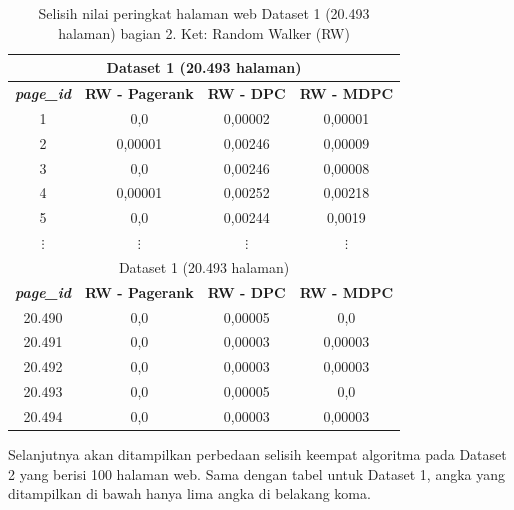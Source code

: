 \begin{longtable}{|c|c|c|c|}
	\caption{Selisih nilai peringkat halaman web Dataset 1 (20.493 halaman) bagian 2. Ket: Random Walker (RW)}
	\label{table:rank_value_difference_dataset_1_part_2} \\
	\hline
	\multicolumn{4}{|c|}{Dataset 1 (20.493 halaman)} \\
	\hline
	\textbf{\textit{page\_id}} & \textbf{RW - Pagerank} & \textbf{RW - DPC} & \textbf{RW - MDPC} \\
	\hline
	1 & 0,0 & 0,00002 & 0,00001  \\
	2 & 0,00001 & 0,00246 & 0,00009  \\
	3 & 0,0 & 0,00246 & 0,00008  \\
	4 & 0,00001 & 0,00252 & 0,00218  \\
	5 & 0,0 & 0,00244 & 0,0019  \\
	$\vdots$ & $\vdots$ & $\vdots$ & $\vdots$ \\
	\hline
	\hline
	\multicolumn{4}{|c|}{Dataset 1 (20.493 halaman)} \\
	\hline
	\textbf{\textit{page\_id}} & \textbf{RW - Pagerank} & \textbf{RW - DPC} & \textbf{RW - MDPC} \\
	\hline
	20.490 & 0,0 & 0,00005 & 0,0  \\
	20.491 & 0,0 & 0,00003 & 0,00003  \\
	20.492 & 0,0 & 0,00003 & 0,00003  \\
	20.493 & 0,0 & 0,00005 & 0,0  \\
	20.494 & 0,0 & 0,00003 & 0,00003  \\
	\hline
\end{longtable}

Selanjutnya akan ditampilkan perbedaan selisih keempat algoritma pada Dataset 2 yang berisi 100 halaman web. Sama dengan tabel untuk Dataset 1, angka yang ditampilkan di bawah hanya lima angka di belakang koma.

